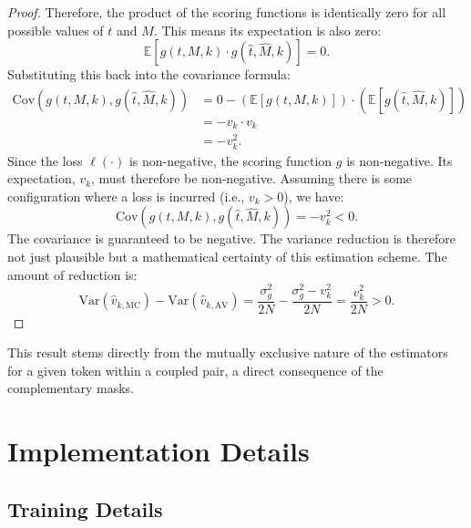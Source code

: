 {\begin{proof}
  Therefore, the product of the scoring functions is identically zero for all possible values of $t$ and $M$. This means its expectation is also zero:
  \begin{equation}
      \mathbb{E}[g(t, M, k) \cdot g(\hat{t}, \hat{M}, k)] = 0.
  \end{equation}
  Substituting this back into the covariance formula:
  \begin{align}
      \text{Cov}(g(t, M, k), g(\hat{t}, \hat{M}, k)) &= 0 - (\mathbb{E}[g(t, M, k)]) \cdot (\mathbb{E}[g(\hat{t}, \hat{M}, k)]) \\
      &= -v_k \cdot v_k \\
      &= -v_k^2.
  \end{align}
  Since the loss $\ell(\cdot)$ is non-negative, the scoring function $g$ is non-negative. Its expectation, $v_k$, must therefore be non-negative. Assuming there is some configuration where a loss is incurred (i.e., $v_k > 0$), we have:
  \begin{equation}
      \text{Cov}(g(t, M, k), g(\hat{t}, \hat{M}, k)) = -v_k^2 < 0.
  \end{equation}
  The covariance is guaranteed to be negative. The variance reduction is therefore not just plausible but a mathematical certainty of this estimation scheme. The amount of reduction is:
  \begin{equation}
      \text{Var}(\hat{v}_{k, \text{MC}}) - \text{Var}(\hat{v}_{k, \text{AV}}) = \frac{\sigma^2_g}{2N} - \frac{\sigma^2_g - v_k^2}{2N} = \frac{v_k^2}{2N} > 0.
  \end{equation}
  \end{proof}
  This result stems directly from the mutually exclusive nature of the estimators for a given token within a coupled pair, a direct consequence of the complementary masks.
}

\section{Implementation Details}
\subsection{Training Details}
\label{appx:exp}
